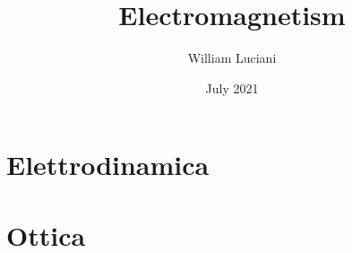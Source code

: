\documentclass{article}
\title{ Electromagnetism }
\author{William Luciani}
\date{July 2021}
\numberwithin{equation}{section}
\begin{document}
\maketitle

\tableofcontents

\pagebreak
















\section{Elettrodinamica} %
\label{sec:elettrodinamica}



\section{Ottica} %
\label{sec:ottica}

\end{document}
